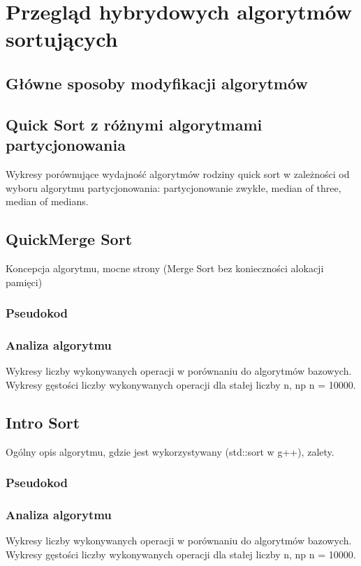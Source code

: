 \chapter{Przegląd hybrydowych algorytmów sortujących}
\thispagestyle{chapterBeginStyle}

\section{Główne sposoby modyfikacji algorytmów}

\section{Quick Sort z różnymi algorytmami partycjonowania}
Wykresy porównujące wydajność algorytmów rodziny quick sort w zależności od wyboru algorytmu partycjonowania:
partycjonowanie zwykłe, median of three, median of medians.


\section{QuickMerge Sort}
Koncepcja algorytmu, mocne strony (Merge Sort bez konieczności alokacji pamięci)

\subsection{Pseudokod}

\subsection{Analiza algorytmu}
Wykresy liczby wykonywanych operacji w porównaniu do algorytmów bazowych.
Wykresy gęstości liczby wykonywanych operacji dla stałej liczby n, np n = 10000.


\section{Intro Sort}
Ogólny opis algorytmu, gdzie jest wykorzystywany (std::sort w g++), zalety.

\subsection{Pseudokod}

\subsection{Analiza algorytmu}
Wykresy liczby wykonywanych operacji w porównaniu do algorytmów bazowych.
Wykresy gęstości liczby wykonywanych operacji dla stałej liczby n, np n = 10000.




